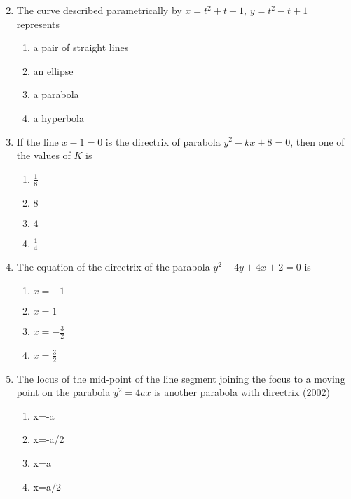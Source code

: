 \begin{enumerate}
\begin{multicols}{4}
\begin{enumerate}
\end{enumerate}\end{multicols}
\item The curve described parametrically by $x=t^2+t+1$, $y=t^2-t+1$ represents
     \hfill{}
										\begin{multicols}{2}
\begin{enumerate}
    \item a pair of straight lines
    \item an ellipse
    \item a parabola
    \item a hyperbola
\end{enumerate}\end{multicols}
\item If the line $x-1=0$ is the directrix of parabola $y^2-kx+8=0$, then one of the values of $K$ is
      \hfill{}
											\begin{multicols}{2}
\begin{enumerate}
    \item $\frac{1}{8}$
    \item $8$
    \item $4$
    \item $\frac{1}{4}$ 
\end{enumerate}\end{multicols}
    \item The equation of the directrix of the parabola $y^2+4y+4x+2=0$ is 
     \hfill {}
												\begin{multicols}{2}
\begin{enumerate}
    \item $x=-1$
    \item $x=1$
    \item $x=-\frac{3}{2}$
     \item $x=\frac{3}{2}$
\end{enumerate}\end{multicols}
\item The locus of the mid-point of the line segment joining the focus to a moving point on the parabola $y^{2} = 4ax$ is another parabola with directrix \hfill{(2002)}
\begin{multicols}{4}
 \begin{enumerate}
    \item x=-a
    \item x=-a/2
    \item x=a
    \item x=a/2
 \end{enumerate}

\end{multicols}
\end{enumerate}
